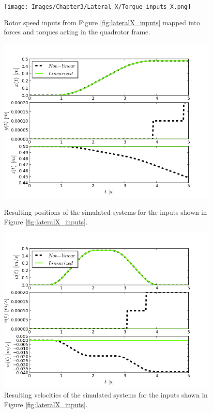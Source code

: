 \begin{figure}[H]
\centering
\texttt{[image: Images/Chapter3/Lateral\_X/Torque\_inputs\_X.png]}
\caption{Rotor speed inputs from Figure \ref{fig:lateralX_inputs} mapped into forces and torques acting in the quadrotor frame.}
\label{fig:lateralX_torqueinputs}
\end{figure}


\begin{figure}[h!]
\centering
\includegraphics[scale=0.7]{Images/Chapter3/Lateral_X/Positions.png}
\caption{Resulting positions of the simulated systems for the inputs shown in Figure \ref{fig:lateralX_inputs}.}
\label{fig:LateralX_positions}

\includegraphics[scale=0.7]{Images/Chapter3/Lateral_X/Linear_velocities.png}
\caption{Resulting velocities of the simulated systems for the inputs shown in Figure \ref{fig:lateralX_inputs}.}
\label{fig:LateralX_velocities}
\end{figure}

